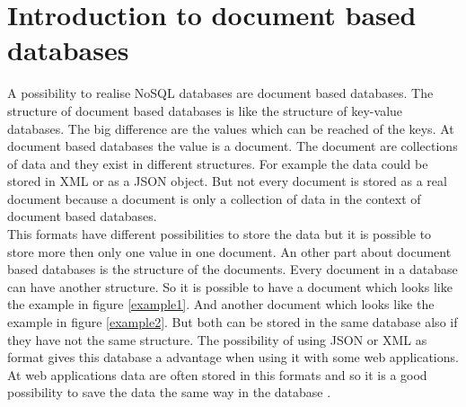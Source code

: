 \section{Introduction to document based databases}
A possibility to realise NoSQL databases are document based databases. The structure of document based databases is like the structure of key-value databases. The big difference are the values which can be reached of the keys. At document based databases the value is a document. The document are collections of data and they exist in different structures. For example the data could be stored in XML or as a JSON object. But not every document is stored as a real document because a document is only a collection of data in the context of document based databases. \\
This formats have different possibilities to store the data but it is possible to store more then only one value in one document. An other part about document based databases is the structure of the documents. Every document in a database can have another structure. 
So it is possible to have a document which looks like the example in figure \ref{example1}.
And another document which looks like the example in figure \ref{example2}. 
%
But both can be stored in the same database also if they have not the same structure. 
The possibility of using JSON or XML as format gives this database a advantage when using it with some web applications. At web applications data are often stored in this formats and so it is a good possibility to save the data the same way in the database \cite{DocDBIntro1,DocDBIntro2,DocDBIntro3}.
